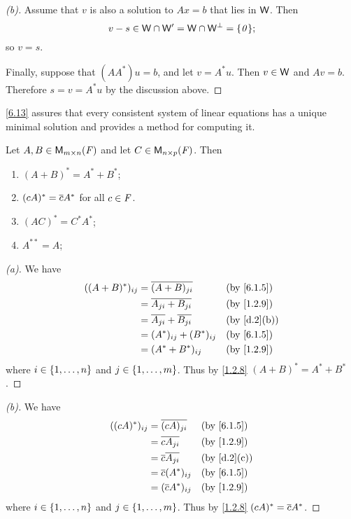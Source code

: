 \begin{proof}[(b)]
	Assume that \(v\) is also a solution to \(Ax = b\) that lies in \(\mathsf{W}\).
	Then
	\[
		v - s \in \W \cap \W' = \W \cap \W^{\perp} = \set{\zv};
	\]
	so \(v = s\).

	Finally, suppose that \((A A^*) u = b\), and let \(v = A^* u\).
	Then \(v \in \mathsf{W}\) and \(Av = b\).
	Therefore \(s = v = A^* u\) by the discussion above.
\end{proof}

\begin{note}
	\cref{6.13} assures that every consistent system of linear equations has a unique minimal solution and provides a method for computing it.
\end{note}

\exercisesection

\setcounter{ex}{4}
\begin{ex}\label{ex:6.3.5}
	Let \(A, B \in \mathsf{M}_{{m} \times n}({\mathit{F}})\) and let \(C \in \mathsf{M}_{{n} \times p}({\mathit{F}})\).
	Then
	\begin{enumerate}
		\item \((A + B)^* = A^* + B^*\);
		\item \((cA)^* = \overline{c} A^*\) for all \(c \in \mathit{F}\).
		\item \((AC)^* = C^* A^*\);
		\item \(A^{**} = A\);
	\end{enumerate}
\end{ex}

\begin{proof}[(a)]
	We have
	\begin{align*}
		((A + B)^*)_{i j} & = \conj{(A + B)_{j i}}            &  & \by{6.1.5}  \\
		                  & = \conj{A_{j i} + B_{j i}}        &  & \by{1.2.9}  \\
		                  & = \conj{A_{j i}} + \conj{B_{j i}} &  & \by{d.2}[b] \\
		                  & = (A^*)_{i j} + (B^*)_{i j}       &  & \by{6.1.5}  \\
		                  & = (A^* + B^*)_{i j}               &  & \by{1.2.9}
	\end{align*}
	where \(i \in \left\lbrace1, \dots, n\right\rbrace\) and \(j \in \left\lbrace1, \dots, m\right\rbrace\).
	Thus by \cref{1.2.8} \((A + B)^* = A^* + B^*\).
\end{proof}

\begin{proof}[(b)]
	We have
	\begin{align*}
		((cA)^*)_{i j} & = \conj{(cA)_{j i}}       &  & \by{6.1.5}  \\
		               & = \conj{c A_{j i}}        &  & \by{1.2.9}  \\
		               & = \conj{c} \conj{A_{j i}} &  & \by{d.2}[c] \\
		               & = \conj{c} (A^*)_{i j}    &  & \by{6.1.5}  \\
		               & = (\conj{c} A^*)_{i j}    &  & \by{1.2.9}
	\end{align*}
	where \(i \in \left\lbrace1, \dots, n\right\rbrace\) and \(j \in \left\lbrace1, \dots, m\right\rbrace\).
	Thus by \cref{1.2.8} \((cA)^* = \overline{c} A^*\).
\end{proof}

